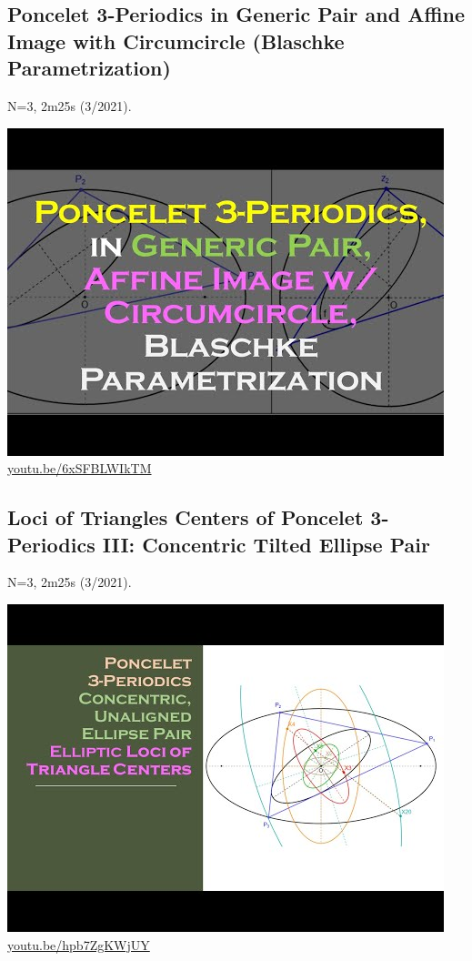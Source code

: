 \documentclass[12pt]{amsart}
\begin{document}
\subsection{Poncelet 3-Periodics in Generic Pair and Affine Image with Circumcircle (Blaschke Parametrization)}
\label{vid:6xSFBLWIkTM}
\noindent N=3, 2m25s (3/2021). 
\begin{center}\includegraphics[width=.5\textwidth]{pics/6xSFBLWIkTM.jpg} \\ 
\href{https://youtu.be/6xSFBLWIkTM}{\url{youtu.be/6xSFBLWIkTM}}\end{center}
% 

\subsection{Loci of Triangles Centers of Poncelet 3-Periodics III: Concentric Tilted Ellipse Pair}
\label{vid:hpb7ZgKWjUY}
\noindent N=3, 2m25s (3/2021). 
\begin{center}\includegraphics[width=.5\textwidth]{pics/hpb7ZgKWjUY.jpg} \\ 
\href{https://youtu.be/hpb7ZgKWjUY}{\url{youtu.be/hpb7ZgKWjUY}}\end{center}
% 
\end{document}
